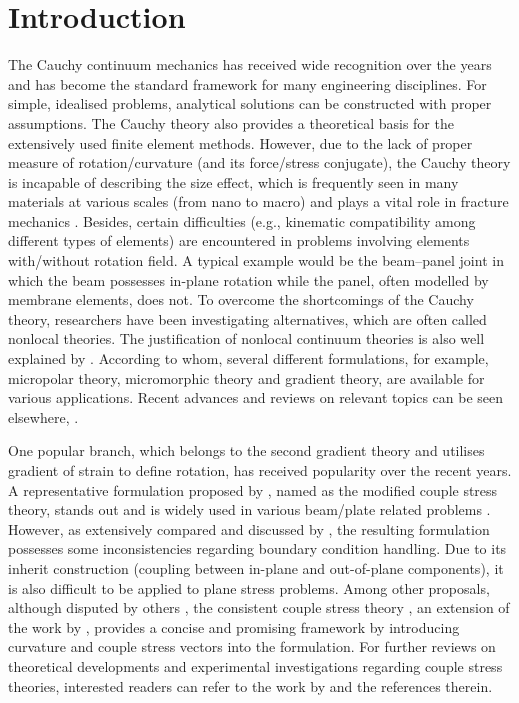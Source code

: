 \documentclass[3p,sort&compress,11pt,fleqn,review]{elsarticle}
\begin{document}
\section{Introduction}
The Cauchy continuum mechanics has received wide recognition over the years and has become the standard framework for many engineering disciplines. For simple, idealised problems, analytical solutions can be constructed \citep[see, e.g.,][]{Timoshenko2010} with proper assumptions. The Cauchy theory also provides a theoretical basis for the extensively used finite element methods. However, due to the lack of proper measure of rotation/curvature (and its force/stress conjugate), the Cauchy theory is incapable of describing the size effect, which is frequently seen in many materials at various scales (from nano to macro) and plays a vital role in fracture mechanics \citep{Bazant1984}. Besides, certain difficulties (e.g., kinematic compatibility among different types of elements) are encountered in problems involving elements with/without rotation field. \alert{A typical example would be the beam--panel joint in which the beam possesses in-plane rotation while the panel, often modelled by membrane elements, does not.} To overcome the shortcomings of the Cauchy theory, researchers have been investigating alternatives, which are often called nonlocal theories. \alert{The justification of nonlocal continuum theories is also well explained by \citet{Eringen2004}. According to whom, several different formulations, for example, micropolar theory, micromorphic theory and gradient theory, are available for various applications.} Recent advances and reviews on relevant topics can be seen elsewhere, \citep[to name a few,][]{Maugin2010,Altenbach2011,Srinivasa2017,Thai2017,Faghidian2018,Shaat2017,Aifantis2011,Salehipour2015,Apuzzo2018,Lim2015,Shaat2020}.

\alert{One popular branch, which belongs to the second gradient theory and utilises gradient of strain to define rotation, has received popularity over the recent years. A representative formulation proposed by \citet{Yang2002}, named as the modified couple stress theory, stands out and is widely used in various beam/plate related problems \citep[see, e.g.,][]{Khakalo2018,Farokhi2018,Kim2019,Thanh2019,Thanh2019a,Fan2020,Yuan2020,Lu2017}. However, as extensively compared and discussed by \citet{Hadjesfandiari2016}, the resulting formulation possesses some inconsistencies regarding boundary condition handling. Due to its inherit construction (coupling between in-plane and out-of-plane components), it is also difficult to be applied to plane stress problems. Among other proposals, although disputed by others \citep{Neff2016}, the consistent couple stress theory \citep{Hadjesfandiari2011}, an extension of the work by \citet{Mindlin1968}, provides a concise and promising framework by introducing curvature and couple stress vectors into the formulation.} For further reviews on theoretical developments and experimental investigations regarding couple stress theories, interested readers can refer to the work by \citet{Pedgaonkar2021} and the references therein.
\end{document}
